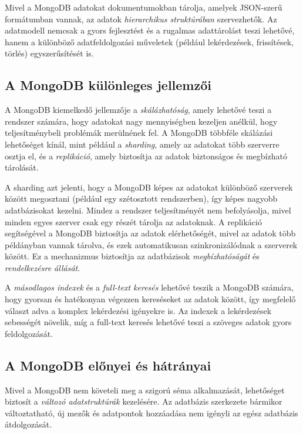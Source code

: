 \documentclass[
]{thesis-ekf}
\theoremstyle{definition}
\theoremstyle{remark}
\begin{document}
Mivel a MongoDB adatokat dokumentumokban tárolja, amelyek JSON-szerű formátumban vannak, az adatok \emph{hierarchikus struktúrában} szervezhetők. Az adatmodell nemcsak a gyors fejlesztést és a rugalmas adattárolást teszi lehetővé, hanem a különböző adatfeldolgozási műveletek (például lekérdezések, frissítések, törlés) egyszerűsítését is. \cite{mongodbOfficial}

\subsection{A MongoDB különleges jellemzői}
A MongoDB kiemelkedő jellemzője a \emph{skálázhatóság}, amely lehetővé teszi a rendszer számára, hogy adatokat nagy mennyiségben kezeljen anélkül, hogy teljesítménybeli problémák merülnének fel. A MongoDB többféle skálázási lehetőséget kínál, mint például a \emph{sharding}, amely az adatokat több szerverre osztja el, és a \emph{replikáció}, amely biztosítja az adatok biztonságos és megbízható tárolását. \cite{mongodbBook}

A sharding azt jelenti, hogy a MongoDB képes az adatokat különböző szerverek között megosztani (például egy szétosztott rendszerben), így képes nagyobb adatbázisokat kezelni. Mindez a rendszer teljesítményét nem befolyásolja, mivel minden egyes szerver csak egy részét tárolja az adatoknak. A replikáció segítségével a MongoDB biztosítja az adatok elérhetőségét, mivel az adatok több példányban vannak tárolva, és ezek automatikusan szinkronizálódnak a szerverek között. Ez a mechanizmus biztosítja az adatbázisok \emph{megbízhatóságát} és \emph{rendelkezésre állását}. \cite{mongodbBook}

A \emph{másodlagos indexek} és a \emph{full-text keresés} lehetővé teszik a MongoDB számára, hogy gyorsan és hatékonyan végezzen kereséseket az adatok között, így megfelelő választ adva a komplex lekérdezési igényekre is. Az indexek a lekérdezések sebességét növelik, míg a full-text keresés lehetővé teszi a szöveges adatok gyors feldolgozását. \cite{mongodbBook}

\subsection{A MongoDB előnyei és hátrányai}
Mivel a MongoDB nem követeli meg a szigorú séma alkalmazását, lehetőséget biztosít a \emph{változó adatstruktúrák} kezelésére. Az adatbázis szerkezete bármikor változtatható, új mezők és adatpontok hozzáadása nem igényli az egész adatbázis átdolgozását.
\end{document}
